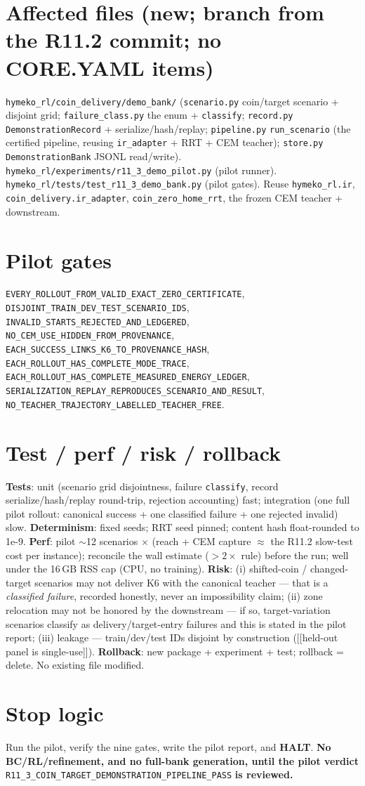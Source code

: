 \documentclass[11pt]{article}
\newcommand{\code}[1]{\texttt{\small #1}}
\newcommand{\gate}[1]{\textcolor{blue!55!black}{\texttt{\small #1}}}
\newcommand{\halt}{\textcolor{red!70!black}{\textbf{HALT}}}
\begin{document}
\section{Affected files (new; branch from the R11.2 commit; no CORE.YAML items)}
\code{hymeko\_rl/coin\_delivery/demo\_bank/} (\code{scenario.py} coin/target scenario + disjoint grid;
\code{failure\_class.py} the enum + \code{classify}; \code{record.py} \code{DemonstrationRecord} + serialize/hash/replay;
\code{pipeline.py} \code{run\_scenario} (the certified pipeline, reusing \code{ir\_adapter} + RRT + CEM teacher);
\code{store.py} \code{DemonstrationBank} JSONL read/write). \code{hymeko\_rl/experiments/r11\_3\_demo\_pilot.py} (pilot
runner). \code{hymeko\_rl/tests/test\_r11\_3\_demo\_bank.py} (pilot gates). Reuse \code{hymeko\_rl.ir},
\code{coin\_delivery.ir\_adapter}, \code{coin\_zero\_home\_rrt}, the frozen CEM teacher + downstream.

\section{Pilot gates}
\gate{EVERY\_ROLLOUT\_FROM\_VALID\_EXACT\_ZERO\_CERTIFICATE},
\gate{DISJOINT\_TRAIN\_DEV\_TEST\_SCENARIO\_IDS},
\gate{INVALID\_STARTS\_REJECTED\_AND\_LEDGERED},
\gate{NO\_CEM\_USE\_HIDDEN\_FROM\_PROVENANCE},
\gate{EACH\_SUCCESS\_LINKS\_K6\_TO\_PROVENANCE\_HASH},
\gate{EACH\_ROLLOUT\_HAS\_COMPLETE\_MODE\_TRACE},
\gate{EACH\_ROLLOUT\_HAS\_COMPLETE\_MEASURED\_ENERGY\_LEDGER},
\gate{SERIALIZATION\_REPLAY\_REPRODUCES\_SCENARIO\_AND\_RESULT},
\gate{NO\_TEACHER\_TRAJECTORY\_LABELLED\_TEACHER\_FREE}.

\section{Test / perf / risk / rollback}
\textbf{Tests}: unit (scenario grid disjointness, failure \code{classify}, record serialize/hash/replay round-trip,
rejection accounting) fast; integration (one full pilot rollout: canonical success + one classified failure + one rejected
invalid) slow. \textbf{Determinism}: fixed seeds; RRT seed pinned; content hash float-rounded to 1e-9.
\textbf{Perf}: pilot $\sim$12 scenarios $\times$ (reach + CEM capture $\approx$ the R11.2 slow-test cost per instance);
reconcile the wall estimate ($>2\times$ rule) before the run; well under the 16\,GB RSS cap (CPU, no training).
\textbf{Risk}: (i) shifted-coin / changed-target scenarios may not deliver K6 with the canonical teacher --- that is a
\emph{classified failure}, recorded honestly, never an impossibility claim; (ii) zone relocation may not be honored by the
downstream --- if so, target-variation scenarios classify as delivery/target-entry failures and this is stated in the pilot
report; (iii) leakage --- train/dev/test IDs disjoint by construction ([[held-out panel is single-use]]).
\textbf{Rollback}: new package + experiment + test; rollback = delete. No existing file modified.

\section{Stop logic}
Run the pilot, verify the nine gates, write the pilot report, and \halt{}. \textbf{No BC/RL/refinement, and no full-bank
generation, until the pilot verdict} \gate{R11\_3\_COIN\_TARGET\_DEMONSTRATION\_PIPELINE\_PASS} \textbf{is reviewed.}
\end{document}

